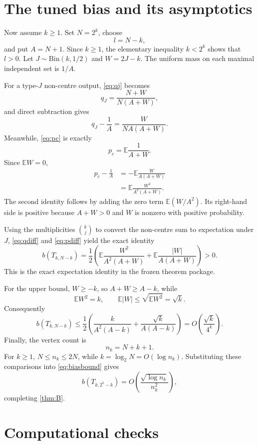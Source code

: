 \documentclass[11pt]{article}
\theoremstyle{definition}
\newcommand{\E}{\mathbb{E}}
\begin{document}
\section{The tuned bias and its asymptotics}\label{sec:tuned}

Now assume $k\ge1$.  Set $N=2^k$, choose
\[
 l=N-k,
\]
and put $A=N+1$.  Since $k\ge1$, the elementary inequality $k<2^k$ shows that $l>0$.  Let $J\sim\mathrm{Bin}(k,1/2)$ and $W=2J-k$.  The uniform mass on each maximal independent set is $1/A$.

For a type-$J$ non-centre output, \eqref{eq:qj} becomes
\[
 q_J=\frac{N+W}{N(A+W)},
\]
and direct subtraction gives
\begin{equation}\label{eq:qdiff}
 q_J-\frac1A
 =\frac{W}{NA(A+W)}.
\end{equation}
Meanwhile, \eqref{eq:pc} is exactly
\[
 p_c=\E\frac1{A+W}.
\]
Since $\E W=0$,
\begin{align}
 p_c-\frac1A
 &= -\E\frac{W}{A(A+W)} \\
 &= \E\frac{W^2}{A^2(A+W)}.\label{eq:pdiff}
\end{align}
The second identity follows by adding the zero term $\E(W/A^2)$.  Its right-hand side is positive because $A+W>0$ and $W$ is nonzero with positive probability.

Using the multiplicities $\binom{k}{j}$ to convert the non-centre sum to expectation under $J$, \eqref{eq:qdiff} and \eqref{eq:pdiff} yield the exact identity
\begin{equation}\label{eq:biasidentity}
 b(T_{k,N-k})
 =\frac12\left(
 \E\frac{W^2}{A^2(A+W)}
 +\E\frac{|W|}{A(A+W)}
 \right)>0.
\end{equation}
This is the exact expectation identity in the frozen theorem package.

For the upper bound, $W\ge-k$, so $A+W\ge A-k$, while
\[
 \E W^2=k,
 \qquad
 \E|W|\le\sqrt{\E W^2}=\sqrt{k}.
\]
Consequently
\begin{equation}\label{eq:biasbound}
 b(T_{k,N-k})
 \le\frac12\left(
 \frac{k}{A^2(A-k)}
 +\frac{\sqrt{k}}{A(A-k)}
 \right)
 =O\!\left(\frac{\sqrt{k}}{4^k}\right).
\end{equation}
Finally, the vertex count is
\[
 n_k=N+k+1.
\]
For $k\ge1$, $N\le n_k\le2N$, while $k=\log_2N=O(\log n_k)$.  Substituting these comparisons into \eqref{eq:biasbound} gives
\[
 b(T_{k,2^k-k})
 =O\!\left(\frac{\sqrt{\log n_k}}{n_k^2}\right),
\]
completing \cref{thm:B}.

\section{Computational checks}\label{sec:computation}
\end{document}
